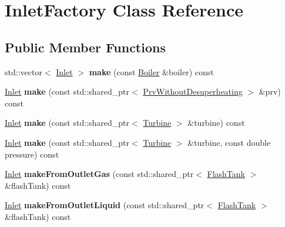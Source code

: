 \hypertarget{class_inlet_factory}{}\section{Inlet\+Factory Class Reference}
\label{class_inlet_factory}
\subsection*{Public Member Functions}
\begin{DoxyCompactItemize}
\item 
\mbox{\label{class_inlet_factory_ac65bfc67123223de9cdec9b8c04ff10d}} 
std\+::vector$<$ \hyperlink{class_inlet}{Inlet} $>$ {\bfseries make} (const \hyperlink{class_boiler}{Boiler} \&boiler) const
\item 
\mbox{\label{class_inlet_factory_abbb5f2f2644b1ad68a82571cab075947}} 
\hyperlink{class_inlet}{Inlet} {\bfseries make} (const std\+::shared\+\_\+ptr$<$ \hyperlink{class_prv_without_desuperheating}{Prv\+Without\+Desuperheating} $>$ \&prv) const
\item 
\mbox{\label{class_inlet_factory_a6642da76a5322ce70d55910075ff7de3}} 
\hyperlink{class_inlet}{Inlet} {\bfseries make} (const std\+::shared\+\_\+ptr$<$ \hyperlink{class_turbine}{Turbine} $>$ \&turbine) const
\item 
\mbox{\label{class_inlet_factory_a93287e435c4d429db96149c5e7591261}} 
\hyperlink{class_inlet}{Inlet} {\bfseries make} (const std\+::shared\+\_\+ptr$<$ \hyperlink{class_turbine}{Turbine} $>$ \&turbine, const double pressure) const
\item 
\mbox{\label{class_inlet_factory_a1c2ae68473be66b8636b420adb54ca94}} 
\hyperlink{class_inlet}{Inlet} {\bfseries make\+From\+Outlet\+Gas} (const std\+::shared\+\_\+ptr$<$ \hyperlink{class_flash_tank}{Flash\+Tank} $>$ \&flash\+Tank) const
\item 
\mbox{\label{class_inlet_factory_a74829dbddf317d0510bd4fceb408853e}} 
\hyperlink{class_inlet}{Inlet} {\bfseries make\+From\+Outlet\+Liquid} (const std\+::shared\+\_\+ptr$<$ \hyperlink{class_flash_tank}{Flash\+Tank} $>$ \&flash\+Tank) const

\end{DoxyCompactItemize}
